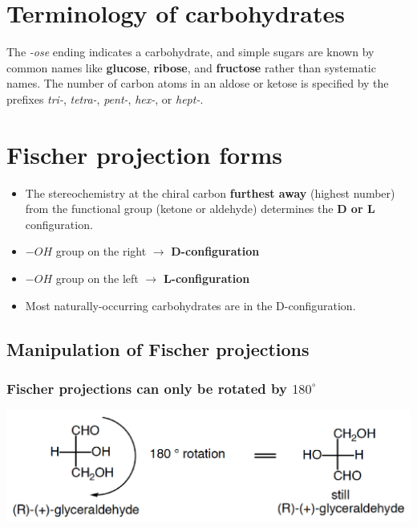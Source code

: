 \documentclass[11pt]{article}
\begin{document}
\section{Terminology of carbohydrates}
\label{sec:org2af075b}
The \emph{-ose} ending indicates a carbohydrate, and simple sugars are known by common names like \textbf{glucose}, \textbf{ribose}, and \textbf{fructose} rather than systematic names. The number of carbon atoms in an aldose or ketose is specified by the prefixes \emph{tri-}, \emph{tetra-}, \emph{pent-}, \emph{hex-}, or \emph{hept-}.


\section{Fischer projection forms}
\label{sec:org9409e7b}
\begin{itemize}
\item The stereochemistry at the chiral carbon \textbf{furthest away} (highest number) from the functional group (ketone or aldehyde) determines the \textbf{D or L} configuration.
\item \(-OH\) group on the right \(\rightarrow\) \textbf{D-configuration}
\item \(-OH\) group on the left \(\rightarrow\) \textbf{L-configuration}
\item Most naturally-occurring carbohydrates are in the D-configuration.
\end{itemize}

\subsection{Manipulation of Fischer projections}
\label{sec:org920a6a2}

\subsubsection{Fischer projections can only be rotated by \(180^{\circ}\)}
\label{sec:orgd2ea49a}
\begin{center}
\includegraphics[width=.9\linewidth]{./images/180-rotation.png}
\end{center}
\end{document}

